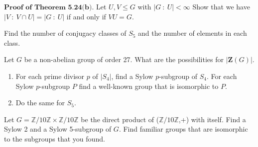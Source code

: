 \documentclass[12pt,letterpaper,boxed]{hmcpset}
\begin{document}

\begin{problem}[5.2.14]
$ \textbf{Proof of Theorem 5.24(b).} $ Let $ U,V \leq G $ with $ |G \ : \ U| < \infty $ Show that we have  $ \vert V \ : \ V \cap U \vert = \vert G \ : \ U \vert $ if and only if $ VU = G $. 
\end{problem}

\begin{solution}

\end{solution}

\clearpage

\begin{problem}[6.2.13]
Find the number of conjugacy classes of $S_5$ and the number of elements in each class. 
\end{problem}

\begin{solution}
\end{solution}

\clearpage

\begin{problem}[6.3.2]
Let $G$ be a non-abelian group of order 27. What are the possibilities for $ \vert \textbf{Z}(G) \vert $. 
\end{problem}

\begin{solution}
\end{solution}

\clearpage


\begin{problem}[7.2.3]
\begin{enumerate}[label=\alph*]
\item For each prime divisor $p$ of $|S_4|$, find a Sylow $p$-subgroup of $S_4$. For each Sylow $p$-subgroup $P$ find a well-known group that is isomorphic to $P$.
\item Do the same for $S_5$.
\end{enumerate}
\end{problem}

\begin{solution}
\end{solution}

\clearpage

\begin{problem}[7.2.4]
Let $ G = \mathbb{Z}/10\mathbb{Z} \times \mathbb{Z}/10\mathbb{Z} $ be the direct product of ($\mathbb{Z}/10\mathbb{Z}$,+) with itself. Find a Sylow 2 and a Sylow 5-subgroup of $G$.  Find familiar groups that are isomorphic to the subgroups that you found.
\end{problem}

\begin{solution}

\end{solution}
\end{document}
